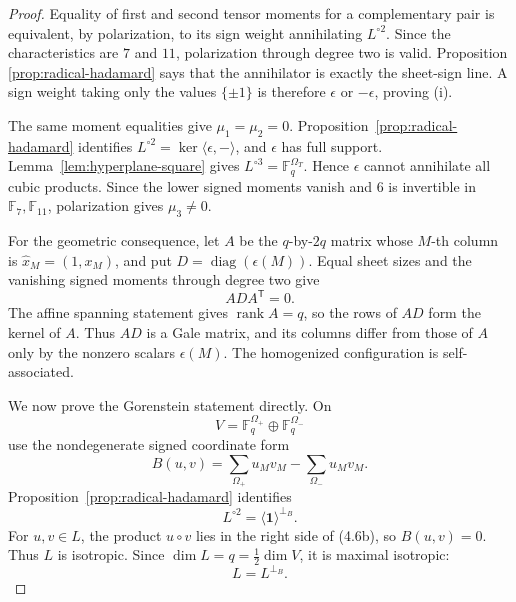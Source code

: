 \documentclass[11pt]{article}
\theoremstyle{definition}
\theoremstyle{remark}
\newcommand{\F}{\mathbb{F}}
\begin{document}
\begin{proof}
Equality of first and second tensor moments for a complementary pair is
equivalent, by polarization, to its sign weight annihilating
\(L^{\circ2}\).  Since the characteristics are \(7\) and \(11\),
polarization through degree two is valid.  Proposition
\ref{prop:radical-hadamard} says that the annihilator is exactly the
sheet-sign line.  A sign weight taking only the values \(\{\pm1\}\) is
therefore \(\epsilon\) or \(-\epsilon\), proving (i).

The same moment equalities give \(\mu_1=\mu_2=0\).
Proposition~\ref{prop:radical-hadamard} identifies
\(L^{\circ2}=\ker\langle\epsilon,-\rangle\), and \(\epsilon\) has full
support.  Lemma~\ref{lem:hyperplane-square} gives
\(L^{\circ3}=\F_q^{\Omega_T}\).  Hence \(\epsilon\) cannot annihilate all
cubic products.  Since the lower signed moments vanish and \(6\) is
invertible in \(\F_7,\F_{11}\), polarization gives \(\mu_3\ne0\).

For the geometric consequence, let \(A\) be the \(q\)-by-\(2q\) matrix
whose \(M\)-th column is
\(\widehat x_M=(1,x_M)\), and put
\(D=\operatorname{diag}(\epsilon(M))\).  Equal sheet sizes and the
vanishing signed moments through degree two give
\[
 A D A^{\mathsf T}=0.
\]
The affine spanning statement gives \(\operatorname{rank}A=q\), so the
rows of \(AD\) form the kernel of \(A\).  Thus \(AD\) is a Gale matrix,
and its columns differ from those of \(A\) only by the nonzero scalars
\(\epsilon(M)\).  The homogenized configuration is self-associated.

We now prove the Gorenstein statement directly.  On
\[
 V=\F_q^{\Omega_+}\oplus\F_q^{\Omega_-}
\]
use the nondegenerate signed coordinate form
\[
 B(u,v)=\sum_{\Omega_+}u_Mv_M-\sum_{\Omega_-}u_Mv_M.
                                                               \tag{4.6a}
\]
Proposition~\ref{prop:radical-hadamard} identifies
\[
 L^{\circ2}
 =\langle\mathbf1\rangle^{\perp_B}.                          \tag{4.6b}
\]
For \(u,v\in L\), the product \(u\circ v\) lies in the right side of
(4.6b), so \(B(u,v)=0\).  Thus \(L\) is isotropic.  Since
\(\dim L=q=\frac12\dim V\), it is maximal isotropic:
\[
 L=L^{\perp_B}.                                              \tag{4.6c}
\]


\end{proof}
\end{document}
